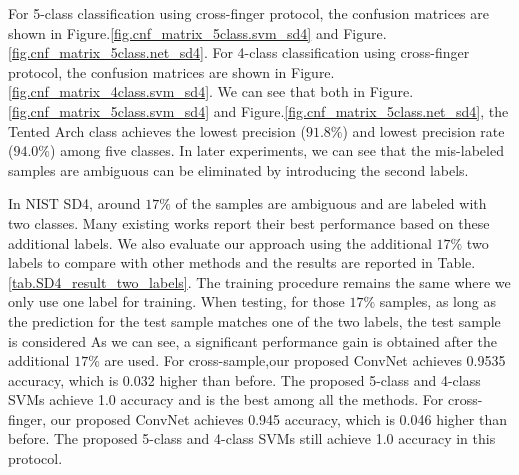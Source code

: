 For 5-class classification using cross-finger protocol, the confusion matrices are shown in Figure.\ref{fig.cnf_matrix_5class.svm_sd4} and Figure.\ref{fig.cnf_matrix_5class.net_sd4}.
%
For 4-class classification using cross-finger protocol, the confusion matrices are shown in Figure.\ref{fig.cnf_matrix_4class.svm_sd4}.
%
We can see that both in Figure.\ref{fig.cnf_matrix_5class.svm_sd4} and Figure.\ref{fig.cnf_matrix_5class.net_sd4}, the Tented Arch class achieves the lowest precision ($91.8\%$) and lowest precision rate ($94.0\%$) among five classes. 
%
In later experiments, we can see that the mis-labeled samples are ambiguous can be eliminated by introducing the second labels.

In NIST SD4, around $17\%$ of the samples are ambiguous and are labeled with two classes. Many existing works report their best performance based on these additional labels.
%
We also evaluate our approach using the additional $17\%$ two labels to compare with other methods and the results are reported in Table.\ref{tab.SD4_result_two_labels}. 
%
The training procedure remains the same where we only use one label for training. 
%
When testing, for those $17\%$ samples, as long as the prediction for the test sample matches one of the two labels, the test sample is considered 
As we can see, a significant performance gain is obtained after the additional $17\%$ are used.
%
For cross-sample,our proposed ConvNet achieves 0.9535 accuracy, which is 0.032 higher than before.
%
The proposed 5-class and 4-class SVMs achieve 1.0 accuracy and is the best among all the methods.
%
For cross-finger, our proposed ConvNet achieves 0.945 accuracy, which is 0.046 higher than before.
%
The proposed 5-class and 4-class SVMs still achieve 1.0 accuracy in this protocol.


